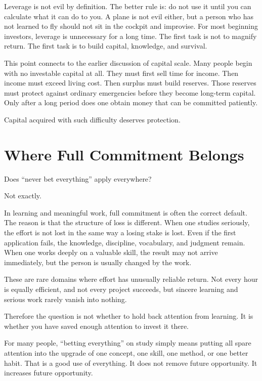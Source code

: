 Leverage is not evil by definition. The better rule is: do not use it until you can calculate what it can do to you. A plane is not evil either, but a person who has not learned to fly should not sit in the cockpit and improvise. For most beginning investors, leverage is unnecessary for a long time. The first task is not to magnify return. The first task is to build capital, knowledge, and survival.

This point connects to the earlier discussion of capital scale. Many people begin with no investable capital at all. They must first sell time for income. Then income must exceed living cost. Then surplus must build reserves. Those reserves must protect against ordinary emergencies before they become long-term capital. Only after a long period does one obtain money that can be committed patiently.

Capital acquired with such difficulty deserves protection.

\section*{Where Full Commitment Belongs}

Does ``never bet everything'' apply everywhere?

Not exactly.

In learning and meaningful work, full commitment is often the correct default. The reason is that the structure of loss is different. When one studies seriously, the effort is not lost in the same way a losing stake is lost. Even if the first application fails, the knowledge, discipline, vocabulary, and judgment remain. When one works deeply on a valuable skill, the result may not arrive immediately, but the person is usually changed by the work.

These are rare domains where effort has unusually reliable return. Not every hour is equally efficient, and not every project succeeds, but sincere learning and serious work rarely vanish into nothing.

Therefore the question is not whether to hold back attention from learning. It is whether you have saved enough attention to invest it there.

For many people, ``betting everything'' on study simply means putting all spare attention into the upgrade of one concept, one skill, one method, or one better habit. That is a good use of everything. It does not remove future opportunity. It increases future opportunity.

